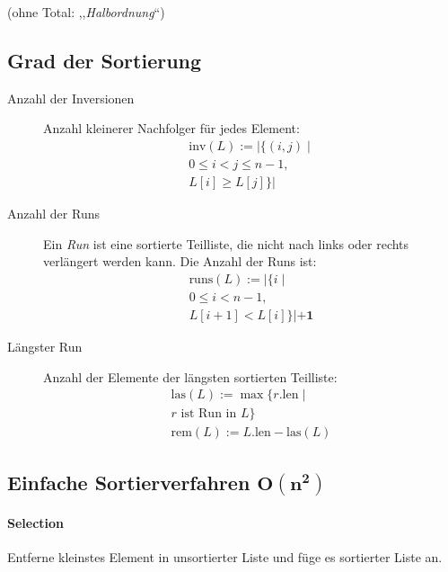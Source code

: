 (ohne Total: ,,\emph{Halbordnung}``)

\subsection{Grad der Sortierung}

\begin{description}
  \item [Anzahl der Inversionen]
        Anzahl kleinerer Nachfolger für jedes Element:
        \begin{gather*}
          \text{inv} (L) := |\{ (i,j) \mid \\
          0 \leq i < j \leq n - 1, \\
          L[i] \geq L[j] \}|
        \end{gather*}

  \item [Anzahl der Runs]
        Ein \emph{Run} ist eine sortierte Teilliste, die nicht nach links oder rechts verlängert werden kann.
        Die Anzahl der Runs ist:
        \begin{gather*}
          \text{runs} (L) := |\{ i \mid \\
          0 \leq i < n - 1, \\
          L[i + 1] < L[i]  \}| \mathbf{+ 1}
        \end{gather*}

  \item [Längster Run]
        Anzahl der Elemente der längsten sortierten Teilliste:
        \begin{gather*}
          \text{las} (L) := \max \{ r.\text{len} \mid \\
          r \text{ ist Run in } L \} \\
          \text{rem} (L) := L.\text{len} - \text{las} (L)
        \end{gather*}
\end{description}

\subsection{Einfache Sortierverfahren $\mathbf{O(n^2)}$}

\paragraph{Selection}
Entferne kleinstes Element in unsortierter Liste und füge es sortierter Liste an.

